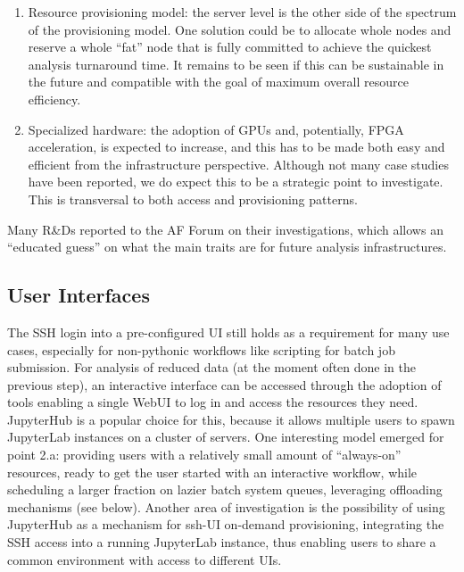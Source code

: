 \begin{enumerate}
\begin{enumerate}[label=(\alph*)]
        \item Resource provisioning model: the server level is the other side of the spectrum of the provisioning model. One solution could be to allocate whole nodes and reserve a whole “fat” node that is fully committed to achieve the quickest analysis turnaround time. It remains to be seen if this can be sustainable in the future and compatible with the goal of maximum overall resource efficiency.
        \item Specialized hardware: the adoption of GPUs and, potentially, FPGA acceleration, is expected to increase, and this has to be made both easy and efficient from the infrastructure perspective. Although not many case studies have been reported, we do expect this to be a strategic point to investigate. This is transversal to both access and provisioning patterns. 
    \end{enumerate}
\end{enumerate}





 


Many R\&Ds reported to the AF Forum on their investigations, which allows an “educated guess” on what the main traits are for future analysis infrastructures. 

\subsection*{User Interfaces}

The SSH login into a pre-configured UI still holds as a requirement for many use cases, especially for non-pythonic workflows like scripting for batch job submission. For analysis of reduced data (at the moment often done in the previous step), an interactive interface can be accessed through the adoption of tools enabling a single WebUI to log in and access the resources they need. JupyterHub is a popular choice for this, because it allows multiple users to spawn JupyterLab instances on a cluster of servers. One interesting model emerged for point 2.a: providing users with a relatively small amount of “always-on” resources, ready to get the user started with an interactive workflow, while scheduling a larger fraction on lazier batch system queues, leveraging offloading mechanisms (see below). Another area of investigation is the possibility of using JupyterHub as a mechanism for ssh-UI on-demand provisioning, integrating the SSH access into a running JupyterLab instance, thus enabling users to share a common environment with access to different UIs.

